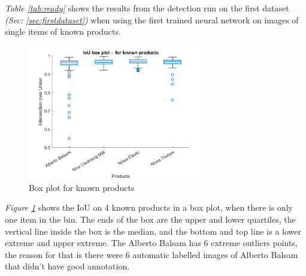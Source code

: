 \begin{table}[h]
\caption{Detection results when tested on trained data}
\label{tab:ready}
\end{table}
\textit{Table \ref{tab:ready}} shows the results from the detection run on the first dataset \textit{(Sec: \ref{sec:firstdataset})} when using the first trained neural network on images of single items of known products.

\begin{figure}[h]
    \centering
    \includegraphics[width=0.7\textwidth]{graphics/results/boxplotForKnownProducts.png}
    \caption{Box plot for known products}
    \label{fig:boxknownproducts}
\end{figure}
\textit{Figure \ref{fig:boxknownproducts}} shows the IoU on 4 known products in a box plot, when there is only one item in the bin. The ends of the box are the upper and lower quartiles,  the vertical line inside the box is the median, and the bottom and top line is a lower extreme and upper extreme. The Alberto Balsam has 6 extreme outliers points, the
reason for that is there were 6 automatic labelled images 
of Alberto Balsam that didn’t have good annotation. 


